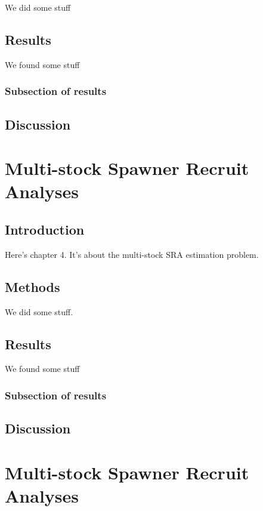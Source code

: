 \documentclass[12pt,]{book}
\theoremstyle{definition}
\theoremstyle{definition}
\theoremstyle{definition}
\theoremstyle{remark}
\begin{document}
We did some stuff

\section{Results}\label{results-1}

We found some stuff

\subsection{Subsection of results}\label{subsection-of-results}

\section{Discussion}\label{discussion-1}

\chapter{Multi-stock Spawner Recruit Analyses}\label{ch4}

\section{Introduction}\label{introduction-2}

Here's chapter 4. It's about the multi-stock SRA estimation problem.

\section{Methods}\label{methods-2}

We did some stuff.

\section{Results}\label{results-2}

We found some stuff

\subsection{Subsection of results}\label{subsection-of-results-1}

\section{Discussion}\label{discussion-2}

\chapter{Multi-stock Spawner Recruit Analyses}\label{ch4}
\end{document}
